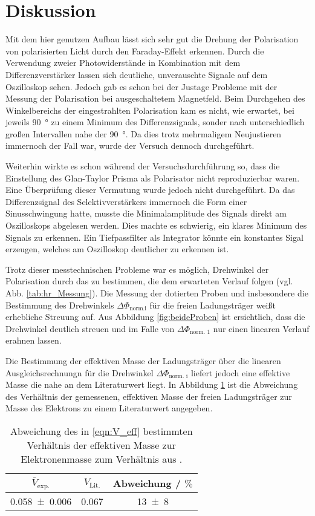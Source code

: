 \section{Diskussion}

Mit dem hier genutzen Aufbau lässt sich sehr gut die Drehung der Polarisation von polarisierten Licht durch den Faraday-Effekt erkennen.
Durch die Verwendung zweier Photowiderstände in Kombination mit dem Differenzverstärker lassen sich deutliche, unverauschte Signale auf dem Oszilloskop sehen.
Jedoch gab es schon bei der Justage Probleme mit der Messung der Polarisation bei ausgeschaltetem Magnetfeld.
Beim Durchgehen des Winkelbereichs der eingestrahlten Polarisation kam es nicht, wie erwartet, bei jeweils \SI{90}{\degree} zu einem Minimum des Differenzsignals,
sonder nach unterschiedlich großen Intervallen nahe der \SI{90}{\degree}.
Da dies trotz mehrmaligem Neujustieren immernoch der Fall war, wurde der Versuch dennoch durchgeführt.
\par \medskip
Weiterhin wirkte es schon während der Versuchsdurchführung so, dass die Einstellung des Glan-Taylor Prisma als Polarisator nicht reproduzierbar waren.
Eine Überprüfung dieser Vermutung wurde jedoch nicht durchgeführt.
Da das Differenzsignal des Selektivverstärkers immernoch die Form einer Sinusschwingung hatte, musste die Minimalamplitude des Signals direkt am Oszilloskops abgelesen werden.
Dies machte es schwierig, ein klares Minimum des Signals zu erkennen. Ein Tiefpassfilter als Integrator könnte ein konstantes Sigal erzeugen, welches am Oszilloskop deutlicher zu erkennen ist.
\par \medskip
Trotz dieser messtechnischen Probleme war es möglich, Drehwinkel der Polarisation durch das  zu bestimmen, die dem erwarteten Verlauf folgen (vgl. Abb. \ref{tab:hr_Messung}).
Die Messung der dotierten Proben und insbesondere die Bestimmung des Drehwinkels $\Delta \Phi_\text{norm.i}$ für die freien Ladungsträger weißt erhebliche Streuung auf.
Aus Abbildung \ref{fig:beideProben} ist ersichtlich, dass die Drehwinkel deutlich streuen und im Falle von $\Delta \Phi_\text{norm. 1}$ nur einen linearen Verlauf erahnen lassen.
\par\medskip
Die Bestimmung der effektiven Masse der Ladungsträger über die linearen Ausgleichsrechnungn für die Drehwinkel $\Delta \Phi_\text{norm. i}$ liefert jedoch eine effektive Masse die nahe an dem Literaturwert liegt.
In Abbildung \ref{tab:Abweichung_lit} ist die Abweichung des Verhältnis der gemessenen, effektiven Masse der freien Ladungsträger zur Masse des Elektrons zu einem Literaturwert angegeben.
\begin{table}[H]
  \centering
  \caption{Abweichung des in \eqref{eqn:V_eff} bestimmten Verhältnis der effektiven Masse zur Elektronenmasse zum Verhältnis aus \cite{eff_lit}.}
  \label{tab:Abweichung_lit}
  \begin{tabular}{ccc}
    \toprule
    $\overline{V}_\text{exp.}$ & $V_\text{Lit.}$ &  Abweichung / $\si{\percent}$ \\
    \midrule
    \num{0.058(6)} & 0.067 & \num{13(8)} \\
    \bottomrule
  \end{tabular}
\end{table}

